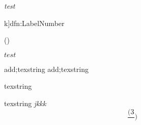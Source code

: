 \begin{itemize}
\end{itemize}

\textit{test}

\begin{dfn}k]{dfn:Label}{Number}
\end{dfn}

()


\texorpdfstring{$test$}{word}

add;texstring
add;texstring





texstring

texstring
\textit{jkkk}
\[\frac{(3}{})\]

